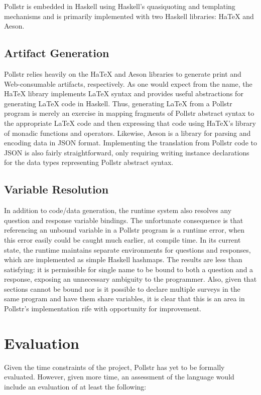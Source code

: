 \documentclass[pldi]{sigplanconf-pldi15}
\begin{document}
Pollstr is embedded in Haskell using Haskell's quasiquoting and templating 
mechanisms and is primarily implemented with two Haskell libraries: HaTeX and Aeson. 
\subsection{Artifact Generation} Pollstr relies heavily on the HaTeX and 
Aeson libraries to generate print and Web-consumable artifacts, respectively. As
one would expect from the name, the HaTeX library implements LaTeX syntax and 
provides useful abstractions for generating LaTeX code in Haskell. Thus, generating
LaTeX from a Pollstr program is merely an exercise in mapping fragments of 
Pollstr abstract syntax to the appropriate LaTeX code and then expressing that 
code using HaTeX's library of monadic functions and operators. Likewise, Aeson is a library 
for parsing and encoding data in JSON format. Implementing the translation 
from Pollstr code to JSON is also fairly straightforward, only requiring 
writing  instance declarations for the data types 
representing Pollstr abstract syntax.

\subsection{Variable Resolution}
In addition to code/data generation, the runtime system also resolves any 
question and response variable bindings. The unfortunate consequence is that 
referencing an unbound variable in a Pollstr program is a runtime error, when 
this error easily could be caught much earlier, at compile time. In its current 
state, the runtime maintains separate environments
for questions and responses, which are implemented as simple Haskell hashmaps. The 
results are less than satisfying: it is permissible for single name to be bound 
to both a question and a response, exposing an unnecessary ambiguity to 
the programmer. Also, given that sections cannot be bound nor is it 
possible to declare multiple surveys in the same program and have them share 
variables, it is clear that this is an area in Pollstr's implementation rife with 
opportunity for improvement.

\section{Evaluation}\label{sec:evaluation}

Given the time constraints of the project, Pollstr has yet to be formally 
evaluated. However, given more time, an assessment of the language would include
an evaluation of at least the following: 
\end{document}
